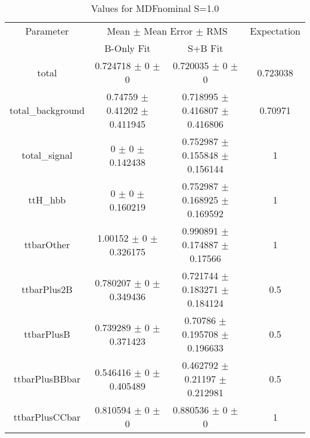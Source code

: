 \begin{table}
\centering
\caption{Values for MDFnominal S=1.0}
\begin{tabular}{cccc}
\toprule
Parameter & \multicolumn{2}{c}{Mean $\pm$ Mean Error $\pm$ RMS} & Expectation\\
 & B-Only Fit & S+B Fit & \\
\midrule
total & \num{0.724718} $\pm$ \num{0} $\pm$ \num{0} & \num{0.720035} $\pm$ \num{0} $\pm$ \num{0} & \num{0.723038}\\
total\_background & \num{0.74759} $\pm$ \num{0.41202} $\pm$ \num{0.411945} & \num{0.718995} $\pm$ \num{0.416807} $\pm$ \num{0.416806} & \num{0.70971}\\
total\_signal & \num{0} $\pm$ \num{0} $\pm$ \num{0.142438} & \num{0.752987} $\pm$ \num{0.155848} $\pm$ \num{0.156144} & \num{1}\\
ttH\_hbb & \num{0} $\pm$ \num{0} $\pm$ \num{0.160219} & \num{0.752987} $\pm$ \num{0.168925} $\pm$ \num{0.169592} & \num{1}\\
ttbarOther & \num{1.00152} $\pm$ \num{0} $\pm$ \num{0.326175} & \num{0.990891} $\pm$ \num{0.174887} $\pm$ \num{0.17566} & \num{1}\\
ttbarPlus2B & \num{0.780207} $\pm$ \num{0} $\pm$ \num{0.349436} & \num{0.721744} $\pm$ \num{0.183271} $\pm$ \num{0.184124} & \num{0.5}\\
ttbarPlusB & \num{0.739289} $\pm$ \num{0} $\pm$ \num{0.371423} & \num{0.70786} $\pm$ \num{0.195708} $\pm$ \num{0.196633} & \num{0.5}\\
ttbarPlusBBbar & \num{0.546416} $\pm$ \num{0} $\pm$ \num{0.405489} & \num{0.462792} $\pm$ \num{0.21197} $\pm$ \num{0.212981} & \num{0.5}\\
ttbarPlusCCbar & \num{0.810594} $\pm$ \num{0} $\pm$ \num{0} & \num{0.880536} $\pm$ \num{0} $\pm$ \num{0} & \num{1}\\
\bottomrule
\end{tabular}
\end{table}
